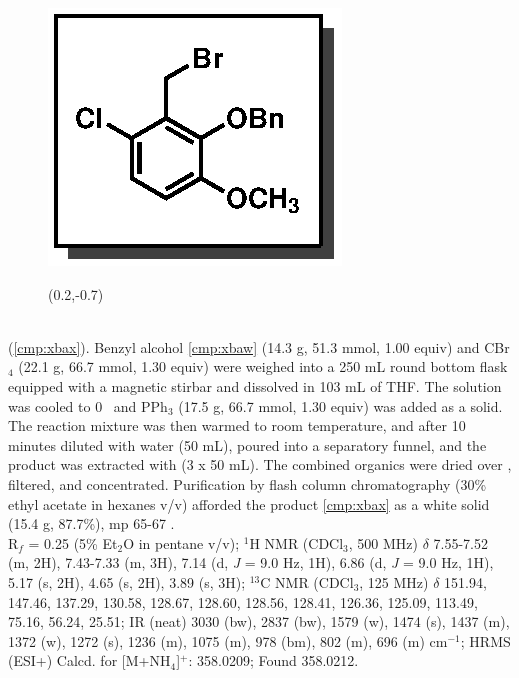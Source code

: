 \vspace{10pt}
\begin{figure}
  \vspace{-25pt}
  \begin{center}
    \includegraphics[scale=0.8]{chp_singlecarbon/images/xbax}
    \begin{textblock}{1}(0.2,-0.7)  \end{textblock}
  \end{center}
  \vspace{-30pt}
\end{figure}\noindent \textbf{\CMPxbax}\\ (\ref{cmp:xbax}). Benzyl alcohol \ref{cmp:xbaw} (14.3
g, 51.3 mmol, 1.00 equiv) and CBr$_4$ (22.1 g, 66.7 mmol, 1.30 equiv) were weighed into a 250 mL
round bottom flask equipped with a magnetic stirbar and dissolved in 103 mL of THF. The solution was
cooled to 0 \degc\  and PPh$_3$ (17.5 g, 66.7 mmol, 1.30 equiv) was added as a solid. The reaction
mixture was then warmed to room temperature, and after 10 minutes diluted with water (50 mL),
poured into a separatory funnel, and the product was extracted with  (3 x 50 mL). The
combined organics were dried over , filtered, and concentrated. Purification by flash
column chromatography (30\% ethyl acetate in hexanes v/v) afforded the product \ref{cmp:xbax} as a
white solid (15.4 g, 87.7\%), mp 65-67 \degc. \\
R$_f$ = 0.25 (5\% Et$_2$O in pentane v/v); $^1$H NMR (CDCl$_3$, 500 MHz) $\delta$ 7.55-7.52 (m, 2H), 7.43-7.33 (m,
3H), 7.14 (d, \textit{J} = 9.0 Hz, 1H), 6.86 (d, \textit{J} = 9.0 Hz, 1H), 5.17 (s, 2H), 4.65 (s, 2H), 3.89 (s, 3H); $^{13}$C NMR (CDCl$_3$, 125 MHz) $\delta$ 151.94, 147.46, 137.29, 130.58, 128.67, 128.60, 128.56, 128.41,
126.36, 125.09, 113.49, 75.16, 56.24, 25.51; IR (neat) 3030 (bw), 2837 (bw), 1579 (w), 1474 (s),
1437 (m), 1372 (w), 1272 (s), 1236 (m), 1075 (m), 978 (bm), 802 (m), 696 (m) cm$^{-1}$; HRMS
(ESI+) Calcd. for  [M+NH$_4$]$^+$: 358.0209; Found 358.0212.

